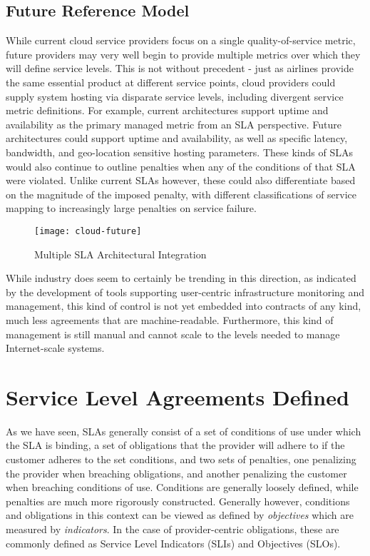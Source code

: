 \subsection{Future Reference Model}
While current cloud service providers focus on a single quality-of-service metric, future providers may very well begin to provide multiple metrics over which they will define service levels.  This is not without precedent - just as airlines provide the same essential product at different service points, cloud providers could supply system hosting via disparate service levels, including divergent service metric definitions.  For example, current architectures support uptime and availability as the primary managed metric from an SLA perspective.  Future architectures could support uptime and availability, as well as specific latency, bandwidth, and geo-location sensitive hosting parameters.  These kinds of SLAs would also continue to outline penalties when any of the conditions of that SLA were violated.  Unlike current SLAs however, these could also differentiate based on the magnitude of the imposed penalty, with different classifications of service mapping to increasingly large penalties on service failure.

\begin{figure}[!t]
\centering
\texttt{[image: cloud-future]}
\caption{Multiple SLA Architectural Integration}
\label{fig:future-cloud-model}
\end{figure}

While industry does seem to certainly be trending in this direction, as indicated by the development of tools supporting user-centric infrastructure monitoring and management, this kind of control is not yet embedded into contracts of any kind, much less agreements that are machine-readable. Furthermore, this kind of management is still manual and cannot scale to the levels needed to manage Internet-scale systems.

\section{Service Level Agreements Defined}\label{sec:SLA-defined}
As we have seen, SLAs generally consist of a set of conditions of use under which the SLA is binding, a set of obligations that the provider will adhere to if the customer adheres to the set conditions, and two sets of penalties, one penalizing the provider when breaching obligations, and another penalizing the customer when breaching conditions of use.  Conditions are generally loosely defined, while penalties are much more rigorously constructed.  Generally however, conditions and obligations in this context can be viewed as defined by {\it objectives} which are measured by {\it indicators}.  In the case of provider-centric obligations, these are commonly defined as Service Level Indicators (SLIs) and Objectives (SLOs).

